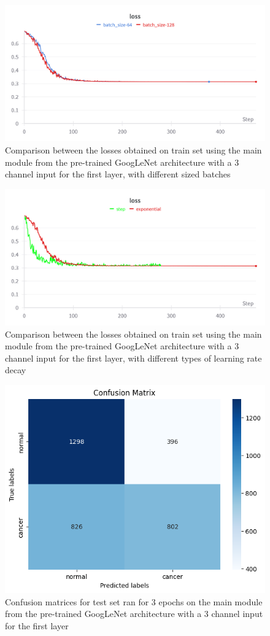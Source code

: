 \begin{figure}[H]
    \centering
    \includegraphics[width=0.75\linewidth]{figures/Figure22.png}
    \caption{Comparison between the losses obtained on train set using the main module from the pre-trained GoogLeNet architecture with a 3 channel input for the first layer, with different sized batches}
    \label{fig:fig21}
\end{figure}

\begin{figure}[!ht]
    \centering
    \includegraphics[width=1\linewidth]{figures/Figure24.png}
    \caption{Comparison between the losses obtained on train set using the main module from the pre-trained GoogLeNet architecture with a 3 channel input for the first layer, with different types of learning rate decay}
    \label{fig:fig22}
\end{figure}

\begin{figure}[H]
    \centering
    \includegraphics[width=0.5\linewidth]{figures/Figure37.png}
    \caption{Confusion matrices for test set ran for 3 epochs on the main module from the pre-trained GoogLeNet architecture with a 3 channel input for the first layer}
    \label{fig:fig31}
\end{figure}

